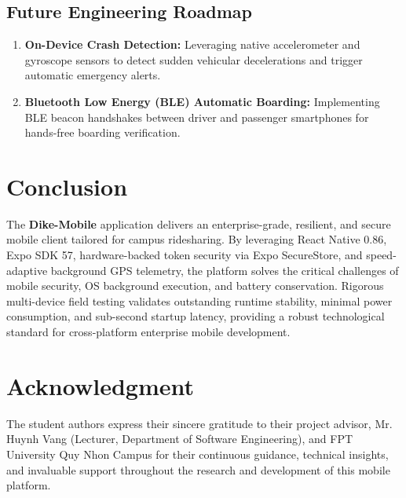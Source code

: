\documentclass[conference,10pt,a4paper]{IEEEtran}
\begin{document}
\subsection{Future Engineering Roadmap}
\begin{enumerate}
    \item \textbf{On-Device Crash Detection:} Leveraging native accelerometer and gyroscope sensors to detect sudden vehicular decelerations and trigger automatic emergency alerts.
    \item \textbf{Bluetooth Low Energy (BLE) Automatic Boarding:} Implementing BLE beacon handshakes between driver and passenger smartphones for hands-free boarding verification.
\end{enumerate}

\section{Conclusion}
The \textbf{Dike-Mobile} application delivers an enterprise-grade, resilient, and secure mobile client tailored for campus ridesharing. By leveraging React Native 0.86, Expo SDK 57, hardware-backed token security via Expo SecureStore, and speed-adaptive background GPS telemetry, the platform solves the critical challenges of mobile security, OS background execution, and battery conservation. Rigorous multi-device field testing validates outstanding runtime stability, minimal power consumption, and sub-second startup latency, providing a robust technological standard for cross-platform enterprise mobile development.

\section*{Acknowledgment}
The student authors express their sincere gratitude to their project advisor, Mr. Huynh Vang (Lecturer, Department of Software Engineering), and FPT University Quy Nhon Campus for their continuous guidance, technical insights, and invaluable support throughout the research and development of this mobile platform.
\end{document}
